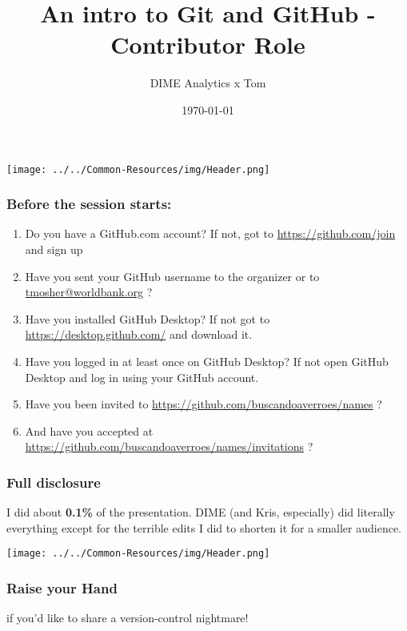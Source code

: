 \documentclass[aspectratio=169]{beamer} %
\title{An intro to Git and GitHub - Contributor Role}
\author{DIME Analytics x Tom}
\institute{DIME - The World Bank - \trainingURL{https://www.worldbank.org/en/research/dime}}
\date{\today}
\makeatletter
\newcommand{\trainingURL}[1]{{\color{blue}\url{#1}}}
\newcommand{\traininerUsername}{buscandoaverroes}
\newcommand{\repoName}{\traininerUsername/names}
\newcommand{\trainingRepoURL}[1]{\trainingURL{https://github.com/\repoName #1}}
\newcommand{\trainerEmail}{\trainingURL{tmosher@worldbank.org} }
\makeatother
\begin{document}
\begin{frame}
\texttt{[image: ../../Common-Resources/img/Header.png]}
\vspace{-0.2cm}
\titlepage 	 %
\end{frame}

\begin{frame}
\frametitle{Before the session starts:}
	\begin{enumerate}
		\item Do you have a GitHub.com account? If not, got to \trainingURL{https://github.com/join} and sign up
		\item Have you sent your GitHub username to the organizer or to \trainerEmail?
		\item Have you installed GitHub Desktop? If not got to \trainingURL{https://desktop.github.com/} and download it.
		\item Have you logged in at least once on GitHub Desktop? If not open GitHub Desktop and log in using your GitHub account.
		\item Have you been invited to \trainingRepoURL{} ?
		\item And have you accepted at \trainingRepoURL{/invitations} ?
	\end{enumerate}

\end{frame}

\begin{frame}
\frametitle{Full disclosure}

	I did about \textbf{0.1\%} of the presentation. DIME (and Kris, especially) did literally everything
	except for the terrible edits I did to shorten it for a smaller audience.


\end{frame}


\begin{frame}
\texttt{[image: ../../Common-Resources/img/Header.png]}
\vspace{-0.2cm}
\titlepage 	 %
\end{frame}

\begin{frame}
	\frametitle{Raise your Hand}

	\small if you'd like to share a version-control nightmare!

\end{frame}
\end{document}
